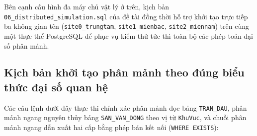 Bên cạnh cấu hình đa máy chủ vật lý ở trên, kịch bản \texttt{06\_distributed\_simulation.sql} của đề tài đồng thời hỗ trợ khởi tạo trực tiếp ba không gian tên (\texttt{site0\_trungtam}, \texttt{site1\_mienbac}, \texttt{site2\_miennam}) trên cùng một thực thể PostgreSQL để phục vụ kiểm thử tức thì toàn bộ các phép toán đại số phân mảnh.

\subsection{Kịch bản khởi tạo phân mảnh theo đúng biểu thức đại số quan hệ}
Các câu lệnh dưới đây thực thi chính xác phân mảnh dọc bảng \texttt{TRAN\_DAU}, phân mảnh ngang nguyên thủy bảng \texttt{SAN\_VAN\_DONG} theo vị từ \texttt{KhuVuc}, và chuỗi phân mảnh ngang dẫn xuất hai cấp bằng phép bán kết nối (\texttt{WHERE EXISTS}):

